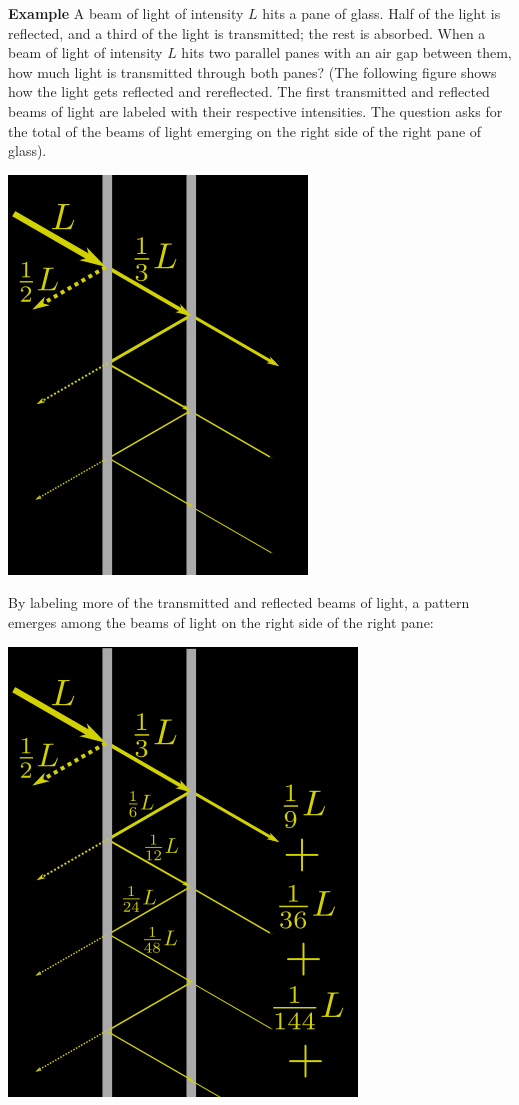 \documentclass[twoside,openright,titlepage,a4paper]{book}
\begin{document}
\begin{sloppypar}
\textbf{Example} A beam of light of intensity $L$ hits a pane of glass. Half of the light is reflected, and a third of the light is transmitted; the rest is absorbed. When a beam of light of intensity $L$ hits two parallel panes with an air gap between them, how much light is transmitted through both panes? (The following figure shows how the light gets reflected and rereflected. The first transmitted and reflected beams of light are labeled with their respective intensities. The question asks for the total of the beams of light emerging on the right side of the right pane of glass).
\begin{center}\includegraphics[scale=0.6]{LightGlass}\end{center}
\begin{examplebox}
By labeling more of the transmitted and reflected beams of light, a pattern emerges among the beams of light on the right side of the right pane:
\begin{center}\includegraphics[scale=0.6]{LightGlassSolved}\end{center}

\end{examplebox}
\end{sloppypar}
\end{document}
